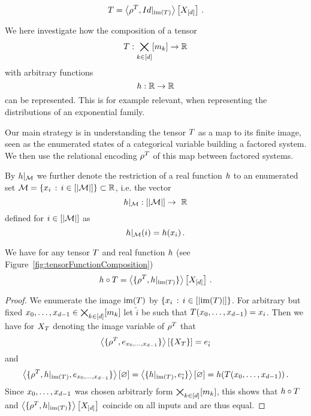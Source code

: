
	\[ T = \left\langle \rho^{T}, {Id}|_{\mathrm{im}\left(T\right)} \right\rangle \left[ X_{[d]} \right] \, . \]

We here investigate how the composition of a tensor 
	\[ T : \bigtimes_{k\in[d]}[m_{k}] \rightarrow \mathbb{R} \]
with arbitrary functions 
	\[ h: \mathbb{R} \rightarrow \mathbb{R} \]
can be represented.
This is for example relevant, when representing the distributions of an exponential family.

Our main strategy is in understanding the tensor $T$ as a map to its finite image, seen as the enumerated states of a categorical variable building a factored system.
We then use the relational encoding $\rho^{T}$ of this map between factored systems. 

By ${h}|_{\mathcal{M}}$ we further denote the restriction of a real function $h$ to an enumerated set $\mathcal{M} =\{x_i \, : \, i \in [\left|\mathcal{M}\right|]\} \subset \mathbb{R}$, i.e. the vector
	\[ \restrictionofto{\chainingfunction}{\mathcal{M}} : [\cardof{\mathcal{M}}] \rightarrow \rr \]
defined for $i \in [\left|\mathcal{M}\right|]$ as
	\[ {h}|_{\mathcal{M}}(i) = h(x_i) \, . \]


\begin{theorem}\label{the:tensorFunctionComposition}
	We have for any tensor $T$ and real function $h$ (see Figure~\ref{fig:tensorFunctionComposition})
		\[ h\circ T = \left\langle \{\rho^{T}, {h}|_{\mathrm{im}\left(T\right)}\}\right\rangle \left[ X_{[d]} \right] \, . \]
\end{theorem}
\begin{proof}
	We enumerate the image $\mathrm{im}(T)$ by $\{x_i \, : \, i \in [\left|\mathrm{im}(T)\right|]\}$.
	For arbitrary but fixed $x_{0},\ldots,x_{d-1}\in\bigtimes_{k\in[d]}[m_{k}]$ let $\tilde{i}$ be such that $T(x_{0},\ldots,x_{d-1}) = x_i$.
	Then we have for $X_{T}$ denoting the image variable of $\rho^{T}$ that
		\[ \left\langle \{\rho^{T},e_{x_{0},\ldots,x_{d-1}}\}\right\rangle \left[ \{X_{T}\} \right] = e_{\tilde{i}} \]
	and
		\[ \left\langle \{\rho^{T}, {h}|_{\mathrm{im}\left(T\right)}, e_{x_{0},\ldots,x_{d-1}}\}\right\rangle \left[ \varnothing \right] = 
		\left\langle \{{h}|_{\mathrm{im}\left(T\right)}, e_{\tilde{i}}\}\right\rangle \left[ \varnothing \right] = 
		h(T(x_{0},\ldots,x_{d-1})) \, . 
		\]
	Since $x_{0},\ldots,x_{d-1}$ was chosen arbitrarly form $\bigtimes_{k\in[d]}[m_{k}]$, this shows that $h\circ T$ and $ \left\langle \{\rho^{T}, {h}|_{\mathrm{im}\left(T\right)}\}\right\rangle \left[ X_{[d]} \right]$ coincide on all inputs and are thus equal.
\end{proof}

